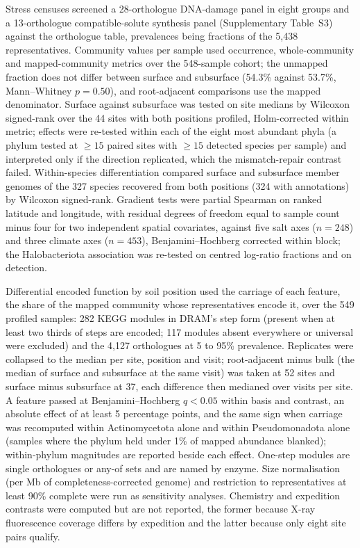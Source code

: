 \documentclass[11pt]{article}
\begin{document}
Stress censuses screened a 28-orthologue DNA-damage panel in eight groups and a 13-orthologue
compatible-solute synthesis panel (Supplementary Table~S3) against the
orthologue table, prevalences being fractions of the 5{,}438 representatives. Community values per
sample used occurrence, whole-community and mapped-community metrics over the 548-sample cohort;
the unmapped fraction does not differ between surface and subsurface (54.3\% against 53.7\%,
Mann--Whitney $p = 0.50$), and root-adjacent comparisons use the mapped denominator. Surface against
subsurface was tested on site medians by Wilcoxon signed-rank over the 44 sites with both positions
profiled, Holm-corrected within metric; effects were re-tested within each of the eight most
abundant phyla (a phylum tested at $\geq 15$ paired sites with $\geq 15$ detected species per
sample) and interpreted only if the direction replicated, which the mismatch-repair contrast failed.
Within-species differentiation compared surface and subsurface member genomes of the 327 species
recovered from both positions (324 with annotations) by Wilcoxon signed-rank. Gradient tests were
partial Spearman on ranked latitude and longitude, with residual degrees of freedom equal to sample count minus four for two independent spatial covariates, against five salt axes ($n = 248$) and three
climate axes ($n = 453$), Benjamini--Hochberg corrected within block; the Halobacteriota association
was re-tested on centred log-ratio fractions and on detection.

Differential encoded function by soil position used the carriage of each feature, the share of the
mapped community whose representatives encode it, over the 549 profiled samples: 282 KEGG modules in
DRAM's step form (present when at least two thirds of steps are encoded; 117 modules absent everywhere
or universal were excluded) and the 4{,}127 orthologues at 5 to 95\% prevalence. Replicates were
collapsed to the median per site, position and visit; root-adjacent minus bulk (the median of surface
and subsurface at the same visit) was taken at 52 sites and surface minus subsurface at 37, each
difference then medianed over visits per site. A feature passed at Benjamini--Hochberg $q < 0.05$
within basis and contrast, an absolute effect of at least 5 percentage points, and the same sign when
carriage was recomputed within Actinomycetota alone and within Pseudomonadota alone (samples where
the phylum held under 1\% of mapped abundance blanked); within-phylum magnitudes are reported beside
each effect. One-step modules are single orthologues or any-of sets and are named by enzyme. Size
normalisation (per Mb of completeness-corrected genome) and restriction to representatives at least
90\% complete were run as sensitivity analyses. Chemistry and expedition contrasts were computed but
are not reported, the former because X-ray fluorescence coverage differs by expedition and the latter
because only eight site pairs qualify.
\end{document}
